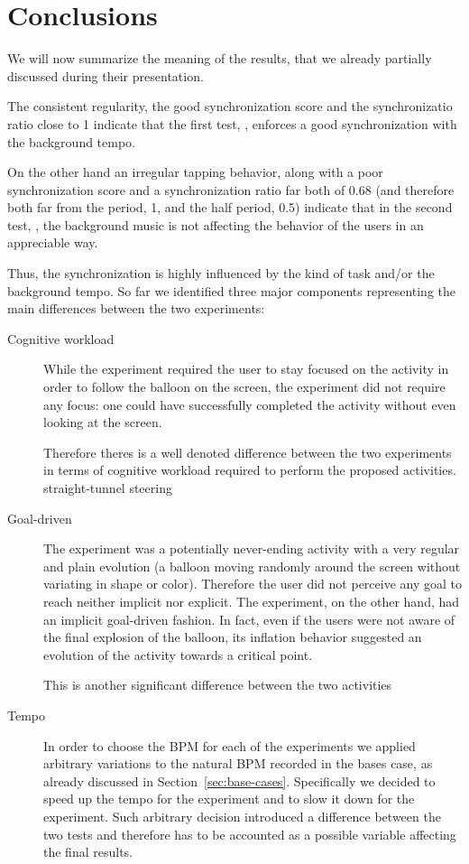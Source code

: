\section{Conclusions}
\label{sec:conclusions}
We will now summarize the meaning of the results, that we already partially discussed during their presentation.

The consistent regularity, the good synchronization score and the synchronizatio ratio close to 1 indicate that the first test, \testfirst, enforces a good synchronization with the background tempo.

On the other hand an irregular tapping behavior, along with a poor synchronization score and a synchronization ratio far both of 0.68 (and therefore both far from the period, 1, and the half period, 0.5) indicate that in the second test, \testsecond, the background music is not affecting the behavior of the users in an appreciable way.

Thus, the synchronization is highly influenced by the kind of task and/or the background tempo. So far we identified three major components representing the main differences between the two experiments:

\begin{description}
	\item[Cognitive workload] While the \testfirst experiment required the user to stay focused on the activity in order to follow the balloon on the screen, the \testsecond experiment did not require any focus: one could have successfully completed the activity without even looking at the screen.

	Therefore theres is a well denoted difference between the two experiments in terms of cognitive workload required to perform the proposed activities.
straight-tunnel steering
	\item[Goal-driven] The \testfirst experiment was a potentially never-ending activity with a very regular and plain evolution (a balloon moving randomly around the screen without variating in shape or color). Therefore the user did not perceive any goal to reach neither implicit nor explicit. The \testsecond experiment, on the other hand, had an implicit goal-driven fashion. In fact, even if the users were not aware of the final explosion of the balloon, its inflation behavior suggested an evolution of the activity towards a critical point.

	This is another significant difference between the two activities

	\item[Tempo] In order to choose the BPM for each of the experiments we applied arbitrary variations to the natural BPM recorded in the bases case, as already discussed in Section~\ref{sec:base-cases}. Specifically we decided to speed up the tempo for the \testfirst experiment and to slow it down for the \testsecond experiment.
	Such arbitrary decision introduced a difference between the two tests and therefore has to be accounted as a possible variable affecting the final results. 
\end{description}

